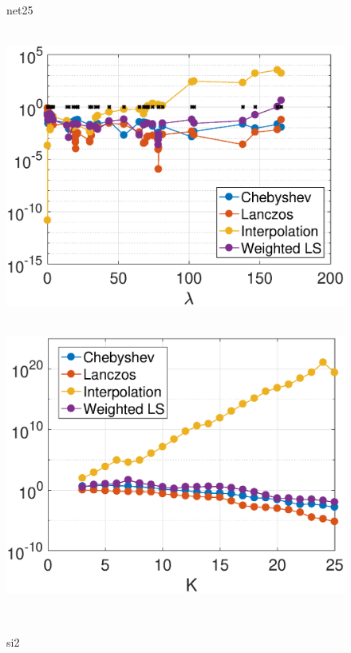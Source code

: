 \documentclass{article}
\begin{document}
\begin{figure}[bth]
\begin{minipage}[m]{0.1\linewidth}
\centerline{\small{net25}}
\end{minipage}
\begin{minipage}[m]{0.44\linewidth}
\centerline{~~\includegraphics[width=.95\linewidth]{fig_net25_deg10}}
\end{minipage}
\begin{minipage}[m]{0.44\linewidth}
\centerline{~~\includegraphics[width=.95\linewidth]{fig_net25_err_const_b2}}
\end{minipage}\\
\begin{minipage}[m]{0.1\linewidth}
\centerline{\small{si2}}
\end{minipage}
\begin{minipage}[m]{0.44\linewidth}

\end{minipage}
\end{figure}
\end{document}
